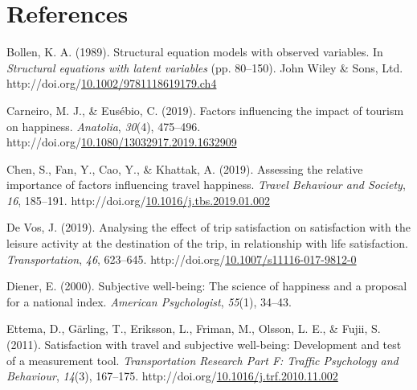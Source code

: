 \documentclass[
11pt, %
oneside, %
english, %
singlespacing, %
]{macthesis} %
\newlength{\cslhangindent}
\newenvironment{CSLReferences}[2] %
{\begin{list}{}{%
	\setlength{\itemindent}{0pt}
	\setlength{\leftmargin}{0pt}
	\setlength{\parsep}{0pt}
	\ifodd #1
	\setlength{\leftmargin}{\cslhangindent}
	\setlength{\itemindent}{-1\cslhangindent}
	\fi
	\setlength{\itemsep}{#2\baselineskip}}}
{\end{list}}
\begin{document}
\backmatter

\chapter*{References}\label{references}


\noindent

\setlength{\parindent}{-0.20in}
\setlength{\leftskip}{0.20in}
\setlength{\parskip}{8pt}

\label{refs}
\begin{CSLReferences}{1}{0}
Bollen, K. A. (1989). Structural equation models with observed variables. In \emph{Structural equations with latent variables} (pp. 80--150). John Wiley \& Sons, Ltd. http://doi.org/\href{https://doi.org/10.1002/9781118619179.ch4}{10.1002/9781118619179.ch4}

Carneiro, M. J., \& Eusébio, C. (2019). Factors influencing the impact of tourism on happiness. \emph{Anatolia}, \emph{30}(4), 475--496. http://doi.org/\href{https://doi.org/10.1080/13032917.2019.1632909}{10.1080/13032917.2019.1632909}

Chen, S., Fan, Y., Cao, Y., \& Khattak, A. (2019). Assessing the relative importance of factors influencing travel happiness. \emph{Travel Behaviour and Society}, \emph{16}, 185--191. http://doi.org/\href{https://doi.org/10.1016/j.tbs.2019.01.002}{10.1016/j.tbs.2019.01.002}

De Vos, J. (2019). Analysing the effect of trip satisfaction on satisfaction with the leisure activity at the destination of the trip, in relationship with life satisfaction. \emph{Transportation}, \emph{46}, 623--645. http://doi.org/\href{https://doi.org/10.1007/s11116-017-9812-0}{10.1007/s11116-017-9812-0}

Diener, E. (2000). Subjective well-being: The science of happiness and a proposal for a national index. \emph{American Psychologist}, \emph{55}(1), 34--43.

Ettema, D., Gärling, T., Eriksson, L., Friman, M., Olsson, L. E., \& Fujii, S. (2011). Satisfaction with travel and subjective well-being: Development and test of a measurement tool. \emph{Transportation Research Part F: Traffic Psychology and Behaviour}, \emph{14}(3), 167--175. http://doi.org/\href{https://doi.org/10.1016/j.trf.2010.11.002}{10.1016/j.trf.2010.11.002}


\end{CSLReferences}
\end{document}
